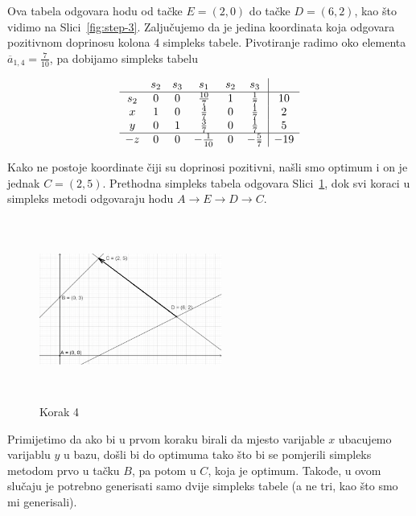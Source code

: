 \documentclass[a4paper, utf8, 11pt, colorlinks]{article}
\begin{document}
Ova tabela odgovara hodu od tačke $E=(2,0)$ do tačke $D=(6,2)$, kao što vidimo na Slici~\ref{fig:step-3}.
Zaljučujemo da je jedina koordinata koja odgovara pozitivnom doprinosu kolona 
4 simpleks tabele. Pivotiranje radimo oko elementa $\overline{a}_{1,4} = \frac{7}{10}$, pa dobijamo simpleks tabelu 

$$\begin{array}{cccccc| c}
	& s_2  & s_3   & s_1  & s_2 & s_3 &     \\ \hline
s_2 &  0   &  0    & \frac{10}{7}    &  1   & \frac{1}{7}   & 10 \\
x   &  1   &  0    &  \frac{4}{7}    &  0   & \frac{1}{7}  & 2 \\
y   &  0   &  1    &  \frac{3}{7}    &  0   & \frac{1}{7}   & 5  \\ \hline
-z  &  0   &  0   &   -\frac{1}{10}  & 0    &  -\frac{5}{7} & -19 \\
\end{array}
$$ 

Kako ne postoje koordinate čiji su doprinosi pozitivni, našli smo optimum i on je jednak 
$C=(2,5)$. Prethodna simpleks tabela odgovara Slici~\ref{fig:step-4}, dok svi koraci u simpleks metodi odgovaraju 
hodu $A \rightarrow E \rightarrow D \rightarrow C$. 

\begin{figure}[H]
	\centering
	\includegraphics[width=170pt, height=170pt]{simpleks-primjer-2-sl4.eps}
	\caption{Korak 4}
	\label{fig:step-4}
\end{figure}


Primijetimo da ako bi u prvom koraku birali da mjesto varijable $x$ ubacujemo varijablu $y$ u bazu, došli bi do optimuma tako što bi se pomjerili simpleks metodom prvo u tačku $B$, pa potom u $C$, koja je optimum. Takođe, u ovom slučaju je potrebno generisati samo dvije simpleks tabele (a ne tri, kao što smo mi generisali).
\end{document}
